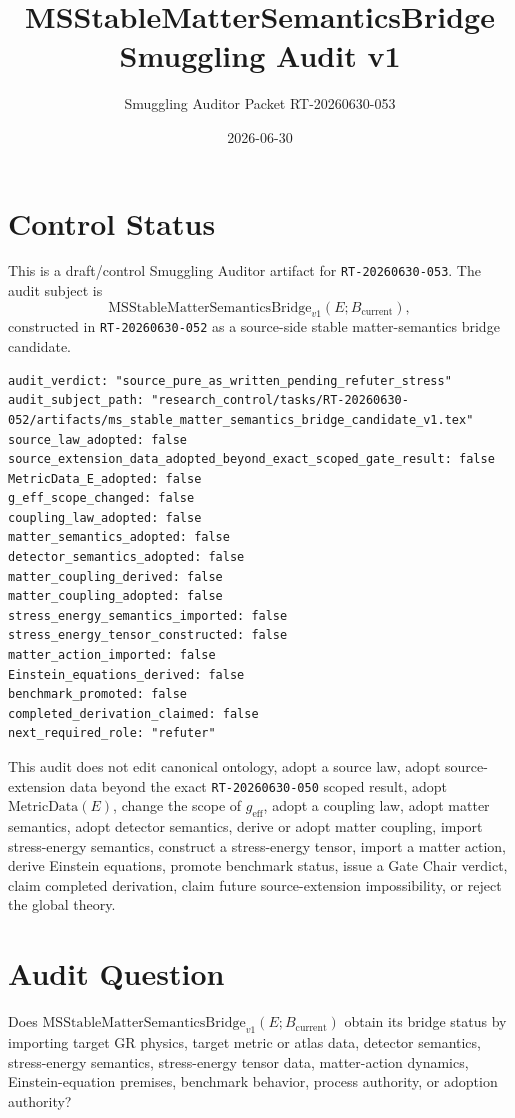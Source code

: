 \documentclass[11pt]{article}
\title{MSStableMatterSemanticsBridge Smuggling Audit v1}
\author{Smuggling Auditor Packet RT-20260630-053}
\date{2026-06-30}
\newcommand{\Bcur}{B_{\mathrm{current}}}
\newcommand{\MSBridge}{\mathrm{MSStableMatterSemanticsBridge}_{v1}}
\newcommand{\MetricData}{\mathrm{MetricData}}
\newcommand{\geff}{g_{\mathrm{eff}}}
\begin{document}
\maketitle

\section{Control Status}

This is a draft/control Smuggling Auditor artifact for
\texttt{RT-20260630-053}. The audit subject is
\[
  \MSBridge(E;\Bcur),
\]
constructed in \texttt{RT-20260630-052} as a source-side stable
matter-semantics bridge candidate.

\begin{verbatim}
audit_verdict: "source_pure_as_written_pending_refuter_stress"
audit_subject_path: "research_control/tasks/RT-20260630-052/artifacts/ms_stable_matter_semantics_bridge_candidate_v1.tex"
source_law_adopted: false
source_extension_data_adopted_beyond_exact_scoped_gate_result: false
MetricData_E_adopted: false
g_eff_scope_changed: false
coupling_law_adopted: false
matter_semantics_adopted: false
detector_semantics_adopted: false
matter_coupling_derived: false
matter_coupling_adopted: false
stress_energy_semantics_imported: false
stress_energy_tensor_constructed: false
matter_action_imported: false
Einstein_equations_derived: false
benchmark_promoted: false
completed_derivation_claimed: false
next_required_role: "refuter"
\end{verbatim}

This audit does not edit canonical ontology, adopt a source law, adopt
source-extension data beyond the exact \texttt{RT-20260630-050} scoped
result, adopt \(\MetricData(E)\), change the scope of \(\geff\), adopt a
coupling law, adopt matter semantics, adopt detector semantics, derive or
adopt matter coupling, import stress-energy semantics, construct a
stress-energy tensor, import a matter action, derive Einstein equations,
promote benchmark status, issue a Gate Chair verdict, claim completed
derivation, claim future source-extension impossibility, or reject the global
theory.

\section{Audit Question}

Does \(\MSBridge(E;\Bcur)\) obtain its bridge status by importing target GR
physics, target metric or atlas data, detector semantics, stress-energy
semantics, stress-energy tensor data, matter-action dynamics,
Einstein-equation premises, benchmark behavior, process authority, or adoption
authority?
\end{document}
